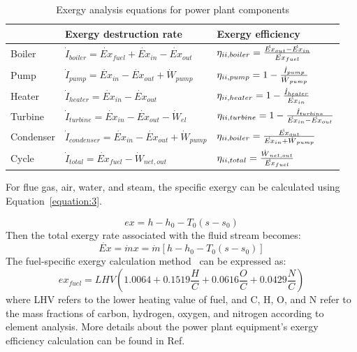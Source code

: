 \documentclass[preprint,12pt]{elsarticle}
\begin{document}
\begin{table}
\caption{Exergy analysis equations for power plant components}
\label{tab:exergy equation}
\centering
\begin{tabular}{lll}
\toprule 
 & Exergy destruction rate & Exergy efficiency\tabularnewline
\midrule
Boiler & $\dot{I}_{boiler}=\dot{Ex}{}_{fuel}+\dot{Ex}{}_{in}-\dot{Ex}{}_{out}$ & $\eta_{\uppercase\expandafter{\romannumeral2},boiler}=\frac{\dot{Ex}{}_{out}-\dot{Ex}{}_{in}}{\dot{Ex}{}_{fuel}}$\tabularnewline
Pump & $\dot{I}_{pump}=\dot{Ex}{}_{in}-\dot{Ex}{}_{out}+\dot{W}{}_{pump}$ & $\eta_{\uppercase\expandafter{\romannumeral2},pump}=1-\frac{\dot{I}_{pump}}{\dot{W}{}_{pump}}$\tabularnewline
Heater & $\dot{I}_{heater}=\dot{Ex}{}_{in}-\dot{Ex}{}_{out}$ & $\eta_{\uppercase\expandafter{\romannumeral2},heater}=1-\frac{\dot{I}_{heater}}{\dot{Ex}{}_{in}}$\tabularnewline
Turbine & $\dot{I}_{turbine}=\dot{Ex}{}_{in}-\dot{Ex}{}_{out}-\dot{W}{}_{el}$ & $\eta_{\uppercase\expandafter{\romannumeral2},turbine}=1-\frac{\dot{I}_{turbine}}{\dot{Ex}{}_{in}-\dot{Ex}{}_{out}}$\tabularnewline
Condenser & $\dot{I}_{condenser}=\dot{Ex}{}_{in}-\dot{Ex}{}_{out}+\dot{W}{}_{pump}$ & $\eta_{\uppercase\expandafter{\romannumeral2},boiler}=\frac{\dot{Ex}{}_{out}}{\dot{Ex}{}_{in}+\dot{W}{}_{pump}}$\tabularnewline
Cycle &$\dot{I}_{total}=\dot{Ex}{}_{fuel}-\dot{W}{}_{net,out}$ & $\eta_{\uppercase\expandafter{\romannumeral2},total}=\frac{\dot{W}{}_{net,out}}{\dot{Ex}{}_{fuel}}$\tabularnewline
\bottomrule
\end{tabular}
\end{table}

For flue gas, air, water, and steam, the specific exergy can be calculated using Equation~\ref{equation:3}.

\begin{equation}{}
\label{equation:3}
ex=h-h_{0}-T_{0}\left(s-s_{0}\right)
\end{equation}
Then the total exergy rate associated with the ﬂuid stream becomes:
\begin{equation}
\dot{Ex}=\dot{m}x=\dot{m}\left[h-h_{0}-T_{0}\left(s-s_{0}\right)\right]{}
\end{equation}
The fuel-specific exergy calculation method~\cite{Yan2016The} can be expressed as:
\begin{equation}
ex_{fuel}=LHV\left(1.0064+0.1519\frac{H}{C}+0.0616\frac{O}{C}+0.0429\frac{N}{C}\right)
\end{equation}
where LHV refers to the lower heating value of fuel, and C, H, O, and N refer to the mass fractions of carbon, hydrogen, oxygen, and nitrogen according to element analysis.
More details about the power plant equipment's exergy efficiency calculation can be found in Ref.~\cite{G2016Exergy}
\end{document}
